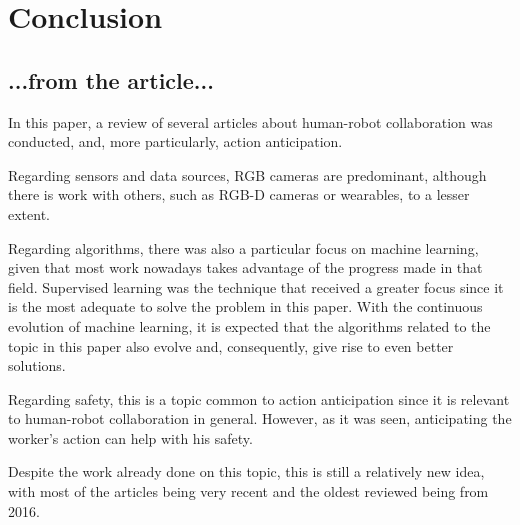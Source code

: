\chapter{Conclusion}
\label{chapter:conclusion}

{\color{red}
\section{...from the article...}
In this paper, a review of several articles about human-robot collaboration was conducted, and, more particularly, action anticipation.

Regarding sensors and data sources, RGB cameras are predominant, although there is work with others, such as RGB-D cameras or wearables, to a lesser extent.

Regarding algorithms, there was also a particular focus on machine learning, given that most work nowadays takes advantage of the progress made in that field. Supervised learning was the technique that received a greater focus since it is the most adequate to solve the problem in this paper. With the continuous evolution of machine learning, it is expected that the algorithms related to the topic in this paper also evolve and, consequently, give rise to even better solutions.

Regarding safety, this is a topic common to action anticipation since it is relevant to human-robot collaboration in general. However, as it was seen, anticipating the worker's action can help with his safety.

Despite the work already done on this topic, this is still a relatively new idea, with most of the articles being very recent and the oldest reviewed being from 2016.
}